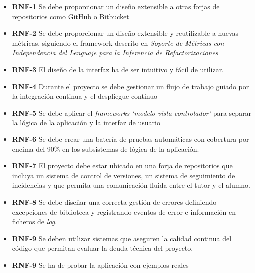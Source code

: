 \begin{itemize}
	\item \textbf{RNF-1} Se debe proporcionar un diseño extensible a otras forjas de repositorios como GitHub o Bitbucket
	\item \textbf{RNF-2} Se debe proporcionar un diseño extensible y reutilizable a nuevas métricas, siguiendo el framework descrito en \textit{Soporte de Métricas con Independencia del Lenguaje para la Inferencia de Refactorizaciones} \citep{marticorena_sanchez_soporte_2005}
	\item \textbf{RNF-3} El diseño de la interfaz ha de ser intuitivo y fácil de utilizar.
	\item \textbf{RNF-4} Durante el proyecto se debe gestionar un flujo de trabajo guiado por la integración continua y el despliegue continuo
	\item \textbf{RNF-5} Se debe aplicar el \textit{frameworks `modelo-vista-controlador'} para separar la lógica de la aplicación y la interfaz de usuario
	\item \textbf{RNF-6} Se debe crear una batería de pruebas automáticas con cobertura por encima del 90\% en los subsistemas de lógica de la aplicación.
	\item \textbf{RNF-7} El proyecto debe estar ubicado en una forja de repositorios que incluya un sistema de control de versiones, un sistema de seguimiento de incidencias y que permita una comunicación fluida entre el tutor y el alumno.
	\item \textbf{RNF-8} Se debe diseñar una correcta gestión de errores definiendo excepciones de biblioteca y registrando eventos de error e información en ficheros de \textit{log}. 
	\item \textbf{RNF-9} Se deben utilizar sistemas que aseguren la calidad continua del código que permitan evaluar la deuda técnica del proyecto.
	\item \textbf{RNF-9} Se ha de probar la aplicación con ejemplos reales
\end{itemize}


